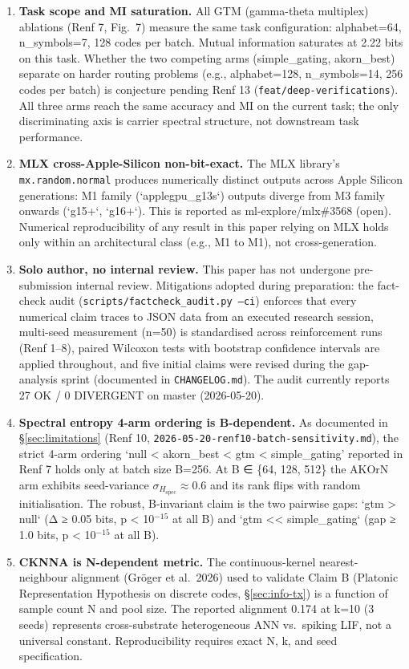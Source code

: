 \documentclass[10pt,twocolumn]{article}
\begin{document}
\begin{enumerate}
\item \textbf{Task scope and MI saturation.} All GTM (gamma-theta multiplex) ablations (Renf 7, Fig.~7) measure the same task configuration: alphabet=64, n\_symbols=7, 128 codes per batch. Mutual information saturates at 2.22 bits on this task. Whether the two competing arms (simple\_gating, akorn\_best) separate on harder routing problems (e.g., alphabet=128, n\_symbols=14, 256 codes per batch) is conjecture pending Renf 13 (\texttt{feat/deep-verifications}). All three arms reach the same accuracy and MI on the current task; the only discriminating axis is carrier spectral structure, not downstream task performance.

\item \textbf{MLX cross-Apple-Silicon non-bit-exact.} The MLX library's \texttt{mx.random.normal} produces numerically distinct outputs across Apple Silicon generations: M1 family (`applegpu\_g13s`) outputs diverge from M3 family onwards (`g15+`, `g16+`). This is reported as ml-explore/mlx\#3568 (open). Numerical reproducibility of any result in this paper relying on MLX holds only within an architectural class (e.g., M1 to M1), not cross-generation.

\item \textbf{Solo author, no internal review.} This paper has not undergone pre-submission internal review. Mitigations adopted during preparation: the fact-check audit (\texttt{scripts/factcheck\_audit.py --ci}) enforces that every numerical claim traces to JSON data from an executed research session, multi-seed measurement (n=50) is standardised across reinforcement runs (Renf 1--8), paired Wilcoxon tests with bootstrap confidence intervals are applied throughout, and five initial claims were revised during the gap-analysis sprint (documented in \texttt{CHANGELOG.md}). The audit currently reports 27 OK / 0 DIVERGENT on master (2026-05-20).

\item \textbf{Spectral entropy 4-arm ordering is B-dependent.} As documented in \S\ref{sec:limitations} (Renf 10, \texttt{2026-05-20-renf10-batch-sensitivity.md}), the strict 4-arm ordering `null < akorn\_best < gtm < simple\_gating' reported in Renf 7 holds only at batch size B=256. At B ∈ \{64, 128, 512\} the AKOrN arm exhibits seed-variance $\sigma_{H_\mathrm{spec}} \approx 0.6$ and its rank flips with random initialisation. The robust, B-invariant claim is the two pairwise gaps: `gtm > null` (Δ ≥ 0.05 bits, p < 10$^{-15}$ at all B) and `gtm << simple\_gating` (gap ≥ 1.0 bits, p < 10$^{-15}$ at all B).

\item \textbf{CKNNA is N-dependent metric.} The continuous-kernel nearest-neighbour alignment (Gröger et al.~2026) used to validate Claim B (Platonic Representation Hypothesis on discrete codes, \S\ref{sec:info-tx}) is a function of sample count N and pool size. The reported alignment 0.174 at k=10 (3 seeds) represents cross-substrate heterogeneous ANN vs.\ spiking LIF, not a universal constant. Reproducibility requires exact N, k, and seed specification.

\end{enumerate}
\end{document}
